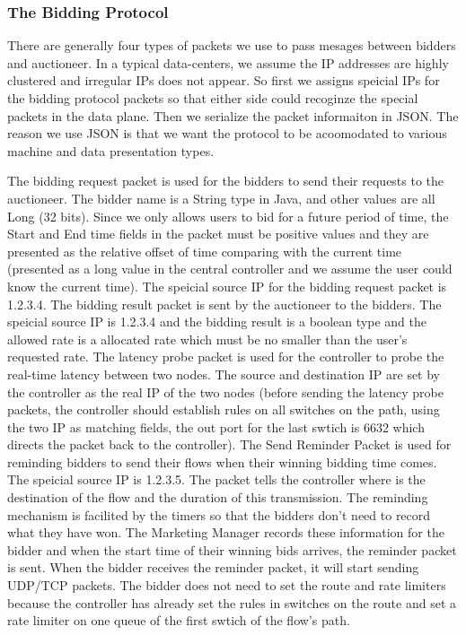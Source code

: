 \documentclass[a4paper,11pt,twocolumn]{article}
\begin{document}
\subsubsection{The Bidding Protocol}
There are generally four types of packets we use to pass mesages between bidders and auctioneer. In a typical data-centers, we assume the IP addresses 
are highly clustered and irregular IPs does not appear. So first we assigns speicial IPs for the bidding protocol packets so that either side could 
recoginze the special packets in the data plane. Then we serialize the packet informaiton in JSON. The reason we use JSON is that we want the protocol to
be acoomodated to various machine and data presentation types. 

The bidding request packet is used for the bidders to send their requests to the auctioneer. The bidder name is a String type in Java, and other 
values are all Long (32 bits). Since we only allows users to bid 
for a future period of time, the Start and End time fields in the packet must be positive values and they 
are presented as the relative offset of time comparing with the current time (presented as a long value in the central controller and
we assume the user could know the current time). The speicial source IP for the bidding request packet is 1.2.3.4. The bidding result packet is sent by the auctioneer to the 
bidders. The speicial source IP is 1.2.3.4 and the bidding result is a boolean type and the allowed rate is a allocated rate which must be no smaller than the 
user's requested rate. The latency probe packet is used for the controller to probe the real-time latency between two nodes. The source and destination IP
are set by the controller as the real IP of the two nodes (before sending the latency probe packets, the controller should establish rules on all
switches on the path, using the two IP as matching fields, the out port for the last swtich is 6632 which directs the packet back to the controller).
The Send Reminder Packet is used for reminding bidders to send their flows when their winning bidding time comes. The speicial source IP is 1.2.3.5. The 
packet tells the controller where is the destination of the flow and the duration of this transmission. The reminding mechanism is facilited by the 
timers so that the bidders don't need to record what they have won. The Marketing Manager records these information for the bidder and when the start time 
of their winning bids arrives, the reminder packet is sent. When the bidder receives the reminder packet, it will start sending UDP/TCP packets. The 
bidder does not need to set the route and rate limiters because the controller has already set the rules in switches on the route and set a rate 
limiter on one queue of the first swtich of the flow's path.
\end{document}
